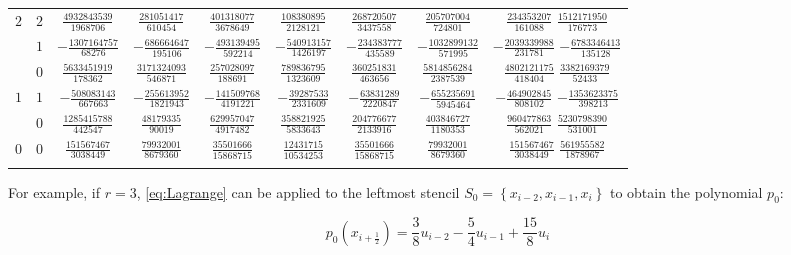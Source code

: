\begin{table}
\begin{center}
\begin{tabular}{ccccccccc}
      $2$  &  $2$  &  $ \frac{ 4932843539}{1968706} $  &  $ \frac{  281051417}{  610454}$  &  $ \frac{ 401318077}{ 3678649} $  &  $ \frac{ 108380895}{ 2128121}$  &  $ \frac{ 268720507}{ 3437558}$  &  $ \frac{ 205707004}{  724801} $  &  $ \frac{  234353207}{  161088}$  $ \frac{ 1512171950}{ 176773}$  \\ \addlinespace
           &  $1$  &  $-\frac{ 1307164757}{  68276} $  &  $-\frac{  686664647}{  195106}$  &  $-\frac{ 493139495}{  592214} $  &  $-\frac{ 540913157}{ 1426197}$  &  $-\frac{ 234383777}{  435589}$  &  $-\frac{1032899132}{  571995} $  &  $-\frac{ 2039339988}{  231781}$  $-\frac{ 6783346413}{ 135128}$  \\ \addlinespace
           &  $0$  &  $ \frac{ 5633451919}{ 178362} $  &  $ \frac{ 3171324093}{  546871}$  &  $ \frac{ 257028097}{  188691} $  &  $ \frac{ 789836795}{ 1323609}$  &  $ \frac{ 360251831}{  463656}$  &  $ \frac{5814856284}{ 2387539} $  &  $ \frac{ 4802121175}{  418404}$  $ \frac{ 3382169379}{  52433}$  \\ \addlinespace
      $1$  &  $1$  &  $-\frac{  508083143}{ 667663} $  &  $-\frac{  255613952}{ 1821943}$  &  $-\frac{ 141509768}{ 4191221} $  &  $-\frac{  39287533}{ 2331609}$  &  $-\frac{  63831289}{ 2220847}$  &  $-\frac{ 655235691}{ 5945464} $  &  $-\frac{  464902845}{  808102}$  $-\frac{ 1353623375}{ 398213}$  \\ \addlinespace
           &  $0$  &  $ \frac{ 1285415788}{ 442547} $  &  $ \frac{   48179335}{   90019}$  &  $ \frac{ 629957047}{ 4917482} $  &  $ \frac{ 358821925}{ 5833643}$  &  $ \frac{ 204776677}{ 2133916}$  &  $ \frac{ 403846727}{ 1180353} $  &  $ \frac{  960477863}{  562021}$  $ \frac{ 5230798390}{ 531001}$  \\ \addlinespace
      $0$  &  $0$  &  $ \frac{  151567467}{3038449} $  &  $ \frac{   79932001}{ 8679360}$  &  $ \frac{  35501666}{15868715} $  &  $ \frac{  12431715}{10534253}$  &  $ \frac{  35501666}{15868715}$  &  $ \frac{  79932001}{ 8679360} $  &  $ \frac{  151567467}{ 3038449}$  $ \frac{  561955582}{1878967}$  \\ \addlinespace
      \bottomrule
    \end{tabular}
  \end{center}
\end{table}

For example, if $r=3$, \eqref{eq:Lagrange} can be applied to the leftmost stencil $S_0=\left\{ x_{i-2}, x_{i-1}, x_i \right\}$ to obtain the polynomial $p_0$:

\begin{equation}
  \label{eq:pol_0}
  p_0(x_{i+\frac{1}{2}}) = \frac{3}{8} u_{i-2} - \frac{5}{4} u_{i-1} + \frac{15}{8} u_i
\end{equation}

